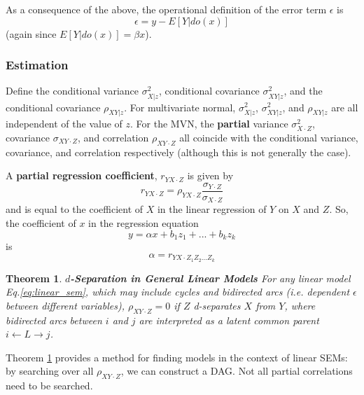 \documentclass[11pt]{article}
\numberwithin{equation}{section}
\newtheorem{thm}{Theorem}[section]
\begin{document}
As a consequence of the above, the operational definition of the error term $\epsilon$ is
\begin{equation}
\epsilon = y - E[Y|do(x)]
\end{equation}
(again since $E[Y|do(x)]=\beta x$). 

\subsubsection{Estimation}

Define the conditional variance $\sigma^2_{X|z}$, conditional covariance $\sigma^2_{XY|z}$, and the conditional covariance $\rho_{XY|z}$. For multivariate normal, $\sigma^2_{X|z}$, $\sigma^2_{XY|z}$, and $\rho_{XY|z}$ are all independent of the value of $z$. For the MVN, the \textbf{partial} variance $\sigma^2_{X\cdot Z}$, covariance $\sigma_{XY\cdot Z}$, and correlation $\rho_{XY\cdot Z}$ all coincide with the conditional variance, covariance, and correlation respectively (although this is not generally the case). 

A \textbf{partial regression coefficient}, $r_{YX\cdot Z}$ is given by
\begin{equation}
r_{YX\cdot Z} = \rho_{YX\cdot Z} \frac{\sigma_{Y\cdot Z}}{\sigma_{X\cdot Z}}
\end{equation}
and is equal to the coefficient of $X$ in the linear regression of $Y$ on $X$ and $Z$. So, the coefficient of $x$ in the regression equation
\begin{equation}
y = \alpha x + b_1 z_1 +...+ b_k z_k
\end{equation}
is
\begin{equation}
\alpha=r_{YX\cdot Z_1Z_2...Z_k}
\end{equation}

\begin{thm}
\textbf{$d$-Separation in General Linear Models} For any linear model Eq.\eqref{eq:linear_sem}, which may include cycles and bidirected arcs (i.e. dependent $\epsilon$ between different variables), $\rho_{XY\cdot Z}=0$ if $Z$ d-separates $X$ from $Y$, where bidirected arcs between $i$ and $j$ are interpreted as a latent common parent $i \leftarrow L \rightarrow j$. \label{thm:d-sep-lin-model}
\end{thm}

Theorem \ref{thm:d-sep-lin-model} provides a method for finding models in the context of linear SEMs: by searching over all $\rho_{XY\cdot Z}$, we can construct a DAG. Not all partial correlations need to be searched.
\end{document}
